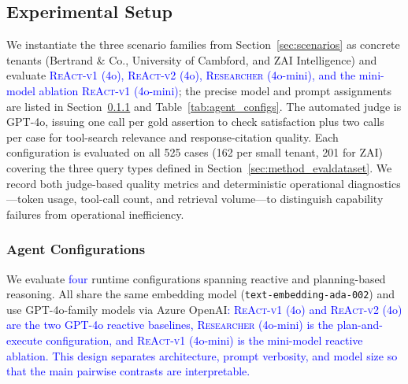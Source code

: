 
\subsection{Experimental Setup}
\label{sec:exp-setup}
We instantiate the three scenario families from Section~\ref{sec:scenarios} as concrete tenants (Bertrand \& Co., University of Cambford, and ZAI Intelligence) and evaluate \textcolor{blue}{\textsc{ReAct-v1} (4o), \textsc{ReAct-v2} (4o), \textsc{Researcher} (4o-mini), and the mini-model ablation \textsc{ReAct-v1} (4o-mini)}; the precise model and prompt assignments are listed in Section~\ref{sec:agent-configs} and Table~\ref{tab:agent_configs}. The automated judge is GPT-4o, issuing one call per gold assertion to check satisfaction plus two calls per case for tool-search relevance and response-citation quality. Each configuration is evaluated on all 525 cases (162 per small tenant, 201 for ZAI) covering the three query types defined in Section~\ref{sec:method_evaldataset}. We record both judge-based quality metrics and deterministic operational diagnostics---token usage, tool-call count, and retrieval volume---to distinguish capability failures from operational inefficiency.

\subsubsection{Agent Configurations}
\label{sec:agent-configs}
We evaluate \textcolor{blue}{four} runtime configurations spanning reactive and planning-based reasoning. All share the same embedding model (\texttt{text-embedding-ada-002}) and use GPT-4o-family models via Azure OpenAI\textcolor{blue}{: \textsc{ReAct-v1} (4o) and \textsc{ReAct-v2} (4o) are the two GPT-4o reactive baselines, \textsc{Researcher} (4o-mini) is the plan-and-execute configuration, and \textsc{ReAct-v1} (4o-mini) is the mini-model reactive ablation. This design separates architecture, prompt verbosity, and model size so that the main pairwise contrasts are interpretable.}

